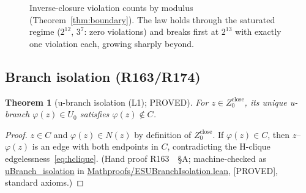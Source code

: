 \documentclass[11pt,a4paper]{article}
\newtheorem{theorem}{Theorem}
\theoremstyle{definition}
\begin{document}
\begin{figure}[t]
  \centering
  \caption{Inverse-closure violation counts by modulus
    (Theorem~\ref{thm:boundary}). The law holds through the saturated
    regime ($2^{12}$, $3^7$: zero violations) and breaks first at
    $2^{13}$ with exactly one violation each, growing sharply beyond.}
  \label{fig:boundary}
\end{figure}

\subsection{Branch isolation (R163/R174)}

\begin{theorem}[u-branch isolation (L1); PROVED]
  \label{thm:l1}
  For $z\in Z_0^{\mathrm{close}}$, its unique u-branch $\varphi(z)\in U_0$
  satisfies $\varphi(z)\notin C$.
\end{theorem}
\begin{proof}
$z\in C$ and $\varphi(z)\in N(z)$ by definition of
$Z_0^{\mathrm{close}}$. If $\varphi(z)\in C$, then $z$--$\varphi(z)$ is
an edge with both endpoints in $C$, contradicting the H-clique
edgelessness~\eqref{eq:hclique}. (Hand proof R163~\cite{R163}~\S A;
machine-checked as \url{uBranch_isolation} in
\url{Mathproofs/ESUBranchIsolation.lean}, [PROVED], standard axioms.)
\end{proof}
\end{document}
